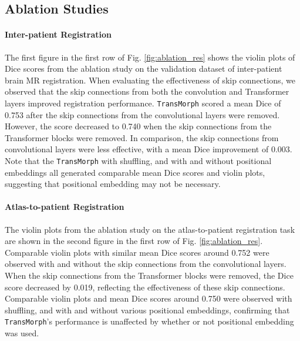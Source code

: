 \documentclass[times,twocolumn,final]{elsarticle}
\begin{document}
\subsection{Ablation Studies}
\label{sec:ablation_res}
\paragraph{Inter-patient Registration} The first figure in the first row of Fig. \ref{fig:ablation_res} shows the violin plots of Dice scores from the ablation study on the validation dataset of inter-patient brain MR registration. When evaluating the effectiveness of skip connections, we observed that the skip connections from both the convolution and Transformer layers improved registration performance. \texttt{TransMorph} scored a mean Dice of 0.753 after the skip connections from the convolutional layers were removed. However, the score decreased to 0.740 when the skip connections from the Transformer blocks were removed. In comparison, the skip connections from convolutional layers were less effective, with a mean Dice improvement of 0.003. Note that the \texttt{TransMorph} with shuffling, and with and without positional embeddings all generated comparable mean Dice scores and violin plots, suggesting that positional embedding may not be necessary.

\paragraph{Atlas-to-patient Registration} The violin plots from the ablation study on the atlas-to-patient registration task are shown in the second figure in the first row of Fig. \ref{fig:ablation_res}. Comparable violin plots with similar mean Dice scores around 0.752 were observed with and without the skip connections from the convolutional layers. When the skip connections from the Transformer blocks were removed, the Dice score decreased by 0.019, reflecting the effectiveness of these skip connections. Comparable violin plots and mean Dice scores around 0.750 were observed with shuffling, and with and without various positional embeddings, confirming that \texttt{TransMorph}'s performance is unaffected by whether or not positional embedding was used.
\end{document}
